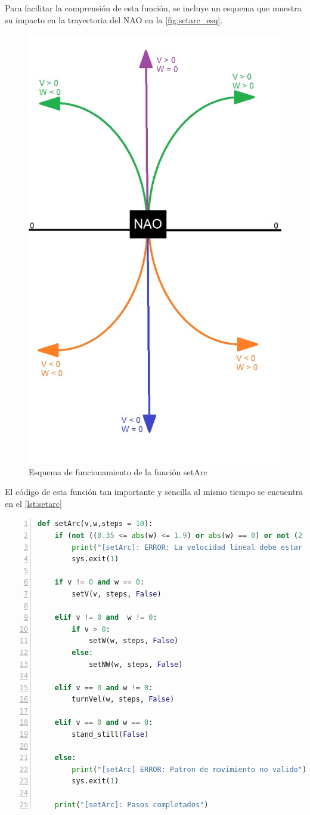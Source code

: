 Para facilitar la comprensión de esta función, se incluye un esquema que muestra su impacto en la trayectoria del NAO en la \autoref{fig:setarc_esq}.

\begin{figure}[H]
  \centering
  \includegraphics[height=0.8\textwidth]{figures/cap_4/esquema_movs.jpeg}
  \caption{Esquema de funcionamiento de la función setArc}
  \label{fig:setarc_esq}
\end{figure}

El código de esta función tan importante y sencilla al mismo tiempo se encuentra en el \autoref{lst:setarc}
\begin{lstlisting}[language=Python, caption={Función setArc}, label={lst:setarc}, numbers=left, backgroundcolor=\color{gray!10}]    
def setArc(v,w,steps = 10):
    if (not ((0.35 <= abs(w) <= 1.9) or abs(w) == 0) or not (2 <= steps) or (steps%2 != 0)) or (not ((0.35 <= abs(v) <= 4.35) or abs(v) == 0) or not (10 <= steps) or (steps%10 != 0)):
        print("[setArc]: ERROR: La velocidad lineal debe estar entre +-0.35 y +-4.35 y la angular entre +-0.35 y +-1.9, y los pasos deben ser multiplos de 10")
        sys.exit(1)

    if v != 0 and w == 0:
        setV(v, steps, False)

    elif v != 0 and  w != 0:
        if v > 0: 
            setW(w, steps, False)
        else:
            setNW(w, steps, False)
    
    elif v == 0 and w != 0:
        turnVel(w, steps, False)
    
    elif v == 0 and w == 0:
        stand_still(False)

    else:
        print("[setArc] ERROR: Patron de movimiento no valido")
        sys.exit(1)
    
    print("[setArc]: Pasos completados")
\end{lstlisting}

